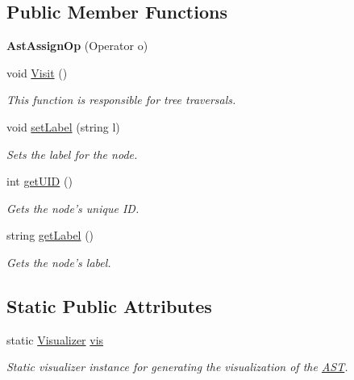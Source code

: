\subsection*{Public Member Functions}
\begin{DoxyCompactItemize}
\item 
\hypertarget{classAstAssignOp_a456b3f679bb212a0520ca400536aa814}{{\bfseries Ast\-Assign\-Op} (Operator o)}\label{classAstAssignOp_a456b3f679bb212a0520ca400536aa814}

\item 
void \hyperlink{classAstAssignOp_a97614556953225b2fedc821732d9fa27}{Visit} ()
\begin{DoxyCompactList}\small\item\em This function is responsible for tree traversals. \end{DoxyCompactList}\item 
void \hyperlink{classAST_a71d680856e95ff89f55d5311a552eba6}{set\-Label} (string l)
\begin{DoxyCompactList}\small\item\em Sets the label for the node. \end{DoxyCompactList}\item 
int \hyperlink{classAST_ab7a5b1d9f1c2de0d98deb356f724a42c}{get\-U\-I\-D} ()
\begin{DoxyCompactList}\small\item\em Gets the node's unique I\-D. \end{DoxyCompactList}\item 
string \hyperlink{classAST_aee029be902fffc927d16ccb03eb922ad}{get\-Label} ()
\begin{DoxyCompactList}\small\item\em Gets the node's label. \end{DoxyCompactList}\end{DoxyCompactItemize}
\subsection*{Static Public Attributes}
\begin{DoxyCompactItemize}
\item 
\hypertarget{classAST_aca9e6637209b31e03a09c0d42f29bdfa}{static \hyperlink{classVisualizer}{Visualizer} \hyperlink{classAST_aca9e6637209b31e03a09c0d42f29bdfa}{vis}}\label{classAST_aca9e6637209b31e03a09c0d42f29bdfa}

\begin{DoxyCompactList}\small\item\em Static visualizer instance for generating the visualization of the \hyperlink{classAST}{A\-S\-T}. \end{DoxyCompactList}\end{DoxyCompactItemize}
